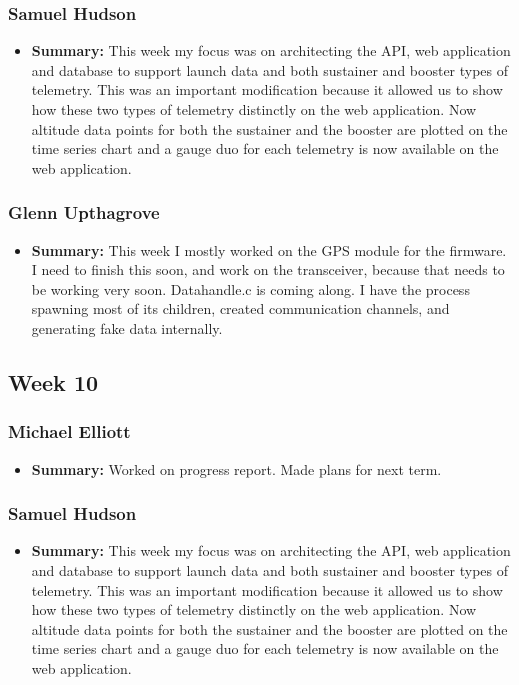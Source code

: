 \documentclass[onecolumn, draftclsnofoot,10pt, compsoc]{IEEEtran}
\begin{document}
\subsubsection{Samuel Hudson}
\begin{itemize}
 \item \textbf{Summary: } This week my focus was on architecting the API, web application and database to support launch data and both sustainer and booster types of telemetry. This was an important modification because it allowed us to show how these two types of telemetry distinctly on the web application. Now altitude data points for both the sustainer and the booster are plotted on the time series chart and a gauge duo for each telemetry is now available on the web application.
\end{itemize}
\subsubsection{Glenn Upthagrove}
\begin{itemize}
 \item \textbf{Summary: }This week I mostly worked on the GPS module for the firmware. I need to finish this soon, and work on the transceiver, because that needs to be working very soon. Datahandle.c is coming along. I have the process spawning most of its children, created communication channels, and generating fake data internally.  
\end{itemize}
\subsection{Week 10}
\subsubsection{Michael Elliott}
\begin{itemize}
 \item \textbf{Summary: } Worked on progress report.
Made plans for next term.
\end{itemize}
\subsubsection{Samuel Hudson}
\begin{itemize}
 \item \textbf{Summary: } This week my focus was on architecting the API, web application and database to support launch data and both sustainer and booster types of telemetry. This was an important modification because it allowed us to show how these two types of telemetry distinctly on the web application. Now altitude data points for both the sustainer and the booster are plotted on the time series chart and a gauge duo for each telemetry is now available on the web application.
\end{itemize}
\end{document}
